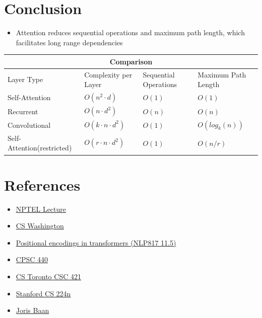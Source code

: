 \documentclass{article}
\begin{document}
\section{Conclusion}
\begin{itemize}
    \item Attention reduces sequential operations and maximum path length, which facilitates long range dependencies
\end{itemize}
\begin{tabular}{ |p{4cm}||p{2cm}|p{2cm}|p{3cm}|  }
 \hline
 \multicolumn{4}{|c|}{Comparison} \\
 \hline
 Layer Type& Complexity per Layer &Sequential Operations & Maximum Path Length\\
 \hline
 Self-Attention   & $O(n^2 \cdot d)$     & $ O(1) $ &   $ O(1) $\\
 Recurrent &   $O(n \cdot d^2)$  & $ O(n) $   & $ O(n) $\\
 Convolutional & $O(k \cdot n \cdot d^2)$  & $ O(1) $ &  $ O( log_k(n) ) $\\
 Self-Attention(restricted)    & $O(r \cdot n \cdot d^2)$  & $ O(1) $ &   $ O(n/r) $\\
 \hline
\end{tabular}

\section{References}
\begin{itemize}
    \item \href{https://www.youtube.com/watch?v=phOc25QfNS0&t=55s}{NPTEL Lecture}
    \item \href{https://courses.cs.washington.edu/courses/cse543/22sp/schedule/lecture15_transformer.pdf}{CS Washington}
    \item \href{https://www.youtube.com/watch?v=5V9gZcAd6cE}{Positional encodings in transformers (NLP817 11.5)}
    \item \href{https://www.cs.ubc.ca/~schmidtm/Courses/440-W22/L20.pdf}{CPSC 440}
    \item \href{https://www.cs.toronto.edu/~rgrosse/courses/csc421_2019/slides/lec16.pdf}{CS Toronto CSC 421}
    \item \href{https://web.stanford.edu/class/cs224n/slides_w25/cs224n-2025-lecture08-transformers.pdf}{Stanford CS 224n}
    \item \href{https://jorisbaan.nl/2022/03/25/implementing-a-transformer-from-scratch.html}{Joris Baan}
\end{itemize}
\end{document}
